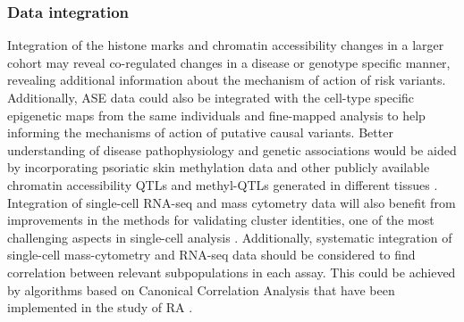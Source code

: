 \subsubsection{Data integration}
 Integration of the histone marks and chromatin accessibility changes in a larger cohort may reveal co-regulated changes in a disease or genotype specific manner, revealing additional information about the mechanism of action of risk variants. Additionally, ASE data could also be integrated with the cell-type specific epigenetic maps from the same individuals and fine-mapped analysis to help informing the mechanisms of action of putative causal variants. Better understanding of disease pathophysiology and genetic associations would be aided by incorporating psoriatic skin methylation data and other publicly available chromatin accessibility QTLs and methyl-QTLs generated in different tissues \parencite{Chandra2018,Pelikan2018,Kumasaka2015,Kumasaka2018,Chen2016,}.
Integration of single-cell RNA-seq and mass cytometry data will also benefit from improvements in the methods for validating cluster identities, one of the most challenging aspects in single-cell analysis \parencite{Kiselev2019}. Additionally, systematic integration of single-cell mass-cytometry and RNA-seq data should be considered to find correlation between relevant subpopulations in each assay. This could be achieved by algorithms based on Canonical Correlation Analysis that have been implemented in the study of RA \parencite{Zhang2018}.


